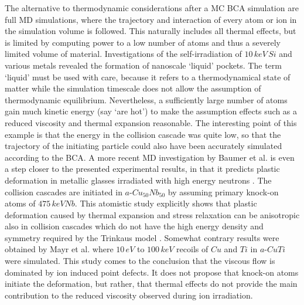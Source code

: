 The alternative to thermodynamic considerations after a MC BCA simulation are full MD simulations, where the trajectory and interaction of every atom or ion in the simulation volume is followed. This naturally includes all thermal effects, but is limited by computing power to a low number of atoms and thus a severely limited volume of material. Investigations of the self-irradiation of $10\,keV\,Si$ and various metals \cite{nordlund_defect_1998} revealed the formation of nanoscale `liquid' pockets. The term `liquid' must be used with care, because it refers to a thermodynamical state of matter while the simulation timescale does not allow the assumption of thermodynamic equilibrium. Nevertheless, a sufficiently large number of atoms gain much kinetic energy (say `are hot') to make the assumption effects such as a reduced viscosity and thermal expansion reasonable. The interesting point of this example is that the energy in the collision cascade was quite low, so that the trajectory of the initiating particle could also have been accurately simulated according to the BCA. A more recent MD investigation by Baumer et al. is even a step closer to the presented experimental results, in that it predicts plastic deformation in metallic glasses irradiated with high energy neutrons \cite{baumer_prediction_2014}. The collision cascades are initiated in $a$-$Cu_{50}Nb_{50}$ by assuming primary knock-on atoms of $475\,keV Nb$. This atomistic study explicitly shows that plastic deformation caused by thermal expansion and stress relaxation can be anisotropic also in collision cascades which do not have the high energy density and symmetry required by the Trinkaus model \cite{trinkaus_viscoelastic_1995}. Somewhat contrary results were obtained by Mayr et al. \cite{mayr_mechanisms_2003} where $10\,eV$ to $100\,keV$ recoils of $Cu$ and $Ti$ in $a$-$CuTi$ were simulated. This study comes to the conclusion that the viscous flow is dominated by ion induced point defects. It does not propose that knock-on atoms initiate the deformation, but rather, that thermal effects do not provide the main contribution to the reduced viscosity observed during ion irradiation.


